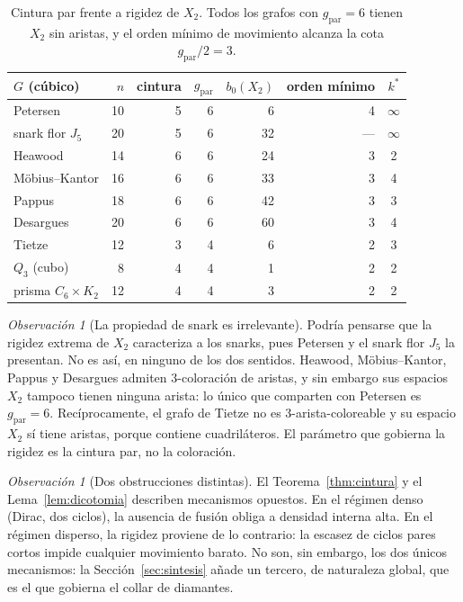 \documentclass[11pt,a4paper]{article}
\theoremstyle{definition}
\theoremstyle{remark}
\newtheorem{observacion}[teorema]{Observación}
\begin{document}
\begin{table}[h]
\centering
\begin{tabular}{lrrrrrc}
\toprule
$G$ (cúbico) & $n$ & cintura & $g_{\mathrm{par}}$ & $b_0(X_2)$ & orden mínimo & $k^*$\\
\midrule
Petersen & 10 & 5 & 6 & 6 & 4 & $\infty$\\
snark flor $J_5$ & 20 & 5 & 6 & 32 & --- & $\infty$\\
Heawood & 14 & 6 & 6 & 24 & 3 & 2\\
Möbius--Kantor & 16 & 6 & 6 & 33 & 3 & 4\\
Pappus & 18 & 6 & 6 & 42 & 3 & 3\\
Desargues & 20 & 6 & 6 & 60 & 3 & 4\\
Tietze & 12 & 3 & 4 & 6 & 2 & 3\\
$Q_3$ (cubo) & 8 & 4 & 4 & 1 & 2 & 2\\
prisma $C_6\times K_2$ & 12 & 4 & 4 & 3 & 2 & 2\\
\bottomrule
\end{tabular}
\caption{Cintura par frente a rigidez de $X_2$. Todos los grafos con $g_{\mathrm{par}}=6$ tienen $X_2$ sin aristas, y el orden mínimo de movimiento alcanza la cota $g_{\mathrm{par}}/2=3$.}\label{tab:cintura}
\end{table}

\begin{observacion}[La propiedad de snark es irrelevante]
Podría pensarse que la rigidez extrema de $X_2$ caracteriza a los snarks, pues Petersen y el snark flor $J_5$ la presentan. No es así, en ninguno de los dos sentidos. Heawood, Möbius--Kantor, Pappus y Desargues admiten $3$-coloración de aristas, y sin embargo sus espacios $X_2$ tampoco tienen ninguna arista: lo único que comparten con Petersen es $g_{\mathrm{par}}=6$. Recíprocamente, el grafo de Tietze no es $3$-arista-coloreable y su espacio $X_2$ sí tiene aristas, porque contiene cuadriláteros. El parámetro que gobierna la rigidez es la cintura par, no la coloración.
\end{observacion}

\begin{observacion}[Dos obstrucciones distintas]
El Teorema~\ref{thm:cintura} y el Lema~\ref{lem:dicotomia} describen mecanismos opuestos. En el régimen denso (Dirac, dos ciclos), la ausencia de fusión obliga a densidad interna alta. En el régimen disperso, la rigidez proviene de lo contrario: la escasez de ciclos pares cortos impide cualquier movimiento barato. No son, sin embargo, los dos únicos mecanismos: la Sección~\ref{sec:sintesis} añade un tercero, de naturaleza global, que es el que gobierna el collar de diamantes.
\end{observacion}
\end{document}
